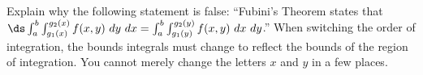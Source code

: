 {Explain why the following statement is false:  ``Fubini's Theorem states that $\ds \int_a^b\int_{g_1(x)}^{g_2(x)} f(x,y)\ dy\ dx = \int_a^b\int_{g_1(y)}^{g_2(y)} f(x,y)\ dx\ dy$.''
}
{When switching the order of integration, the bounds integrals must change to reflect the bounds of the region of integration. You cannot merely change the letters $x$ and $y$ in a few places.
}

